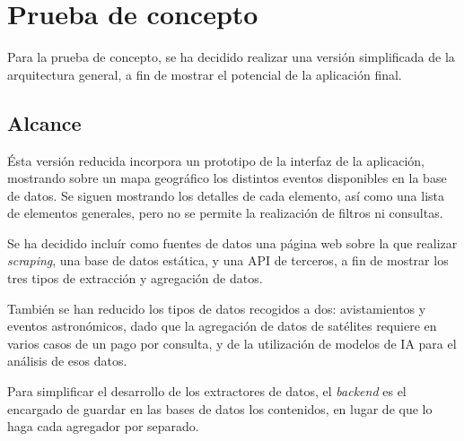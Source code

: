 \section{Prueba de concepto}
Para la prueba de concepto, se ha decidido realizar una versión simplificada de
la arquitectura general, a fin de mostrar el potencial de la aplicación final.


\subsection{Alcance}
Ésta versión reducida incorpora un prototipo de la interfaz de la aplicación,
mostrando sobre un mapa geográfico los distintos eventos disponibles en la base
de datos. Se siguen mostrando los detalles de cada elemento, así como una lista
de elementos generales, pero no se permite la realización de filtros ni
consultas.

Se ha decidido incluír como fuentes de datos una página web sobre la que
realizar \textit{scraping}, una base de datos estática, y una API de terceros,
a fin de mostrar los tres tipos de extracción y agregación de datos.

También se han reducido los tipos de datos recogidos a dos: avistamientos y
eventos astronómicos, dado que la agregación de datos de satélites requiere en
varios casos de un pago por consulta, y de la utilización de modelos de IA para
el análisis de esos datos.

Para simplificar el desarrollo de los extractores de datos, el \textit{backend}
es el encargado de guardar en las bases de datos los contenidos, en lugar de que
lo haga cada agregador por separado.

